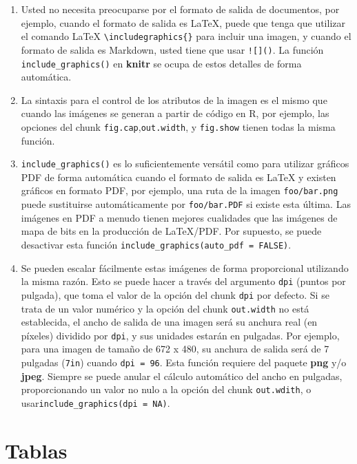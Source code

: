 \documentclass[12pt,]{krantz}
\providecommand{\tightlist}{%
  \setlength{\itemsep}{0pt}\setlength{\parskip}{0pt}}
\theoremstyle{definition}
\theoremstyle{definition}
\theoremstyle{remark}
\begin{document}
\begin{enumerate}
\def\labelenumi{\arabic{enumi}.}
\tightlist
\item
  Usted no necesita preocuparse por el formato de salida de documentos,
  por ejemplo, cuando el formato de salida es LaTeX, puede que tenga que
  utilizar el comando LaTeX \texttt{\textbackslash{}includegraphics\{\}}
  para incluir una imagen, y cuando el formato de salida es Markdown,
  usted tiene que usar \texttt{!{[}{]}()}. La función
  \texttt{include\_graphics()} en \textbf{knitr} se ocupa de estos
  detalles de forma automática.
\item
  La sintaxis para el control de los atributos de la imagen es el mismo
  que cuando las imágenes se generan a partir de código en R, por
  ejemplo, las opciones del chunk \texttt{fig.cap},\texttt{out.width}, y
  \texttt{fig.show} tienen todas la misma función.
\item
  \texttt{include\_graphics()} es lo suficientemente versátil como para
  utilizar gráficos PDF de forma automática cuando el formato de salida
  es LaTeX y existen gráficos en formato PDF, por ejemplo, una ruta de
  la imagen \texttt{foo/bar.png} puede sustituirse automáticamente por
  \texttt{foo/bar.PDF} si existe esta última. Las imágenes en PDF a
  menudo tienen mejores cualidades que las imágenes de mapa de bits en
  la producción de LaTeX/PDF. Por supuesto, se puede desactivar esta
  función \texttt{include\_graphics(auto\_pdf\ =\ FALSE)}.
\item
  Se pueden escalar fácilmente estas imágenes de forma proporcional
  utilizando la misma razón. Esto se puede hacer a través del argumento
  \texttt{dpi} (puntos por pulgada), que toma el valor de la opción del
  chunk \texttt{dpi} por defecto. Si se trata de un valor numérico y la
  opción del chunk \texttt{out.width} no está establecida, el ancho de
  salida de una imagen será su anchura real (en píxeles) dividido por
  \texttt{dpi}, y sus unidades estarán en pulgadas. Por ejemplo, para
  una imagen de tamaño de 672 x 480, su anchura de salida será de 7
  pulgadas (\texttt{7in}) cuando \texttt{dpi\ =\ 96}. Esta función
  requiere del paquete \textbf{png} y/o \textbf{jpeg}. Siempre se puede
  anular el cálculo automático del ancho en pulgadas, proporcionando un
  valor no nulo a la opción del chunk \texttt{out.wdith}, o
  usar\texttt{include\_graphics(dpi\ =\ NA)}.
\end{enumerate}

\hypertarget{tablas}{\section{Tablas}\label{tablas}}
\end{document}
